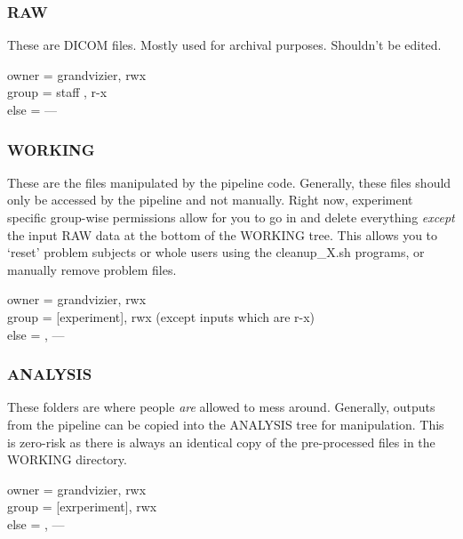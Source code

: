 \documentclass[final,titlepage,letterpaper,oneside,12pt]{article}
\renewcommand{\texttt}[2][BrickRed]{\textcolor{#1}{\ttfamily #2}}%
\begin{document}
\subsubsection{RAW}

These are DICOM files. Mostly used for archival purposes. Shouldn't be edited.

\begin{flushleft}
\texttt{owner = grandvizier, rwx \\
        group = staff      , r-x \\
        else  = ---} \\
\end{flushleft}

\subsubsection{WORKING}

These are the files manipulated by the pipeline code. Generally, these files should only be accessed by the pipeline and not manually. Right now, experiment specific group-wise permissions allow for you to go in and delete everything \textit{except} the input RAW data at the bottom of the WORKING tree. This allows you to `reset' problem subjects or whole users using the {\color{red}\texttt{cleanup\_X.sh}} programs, or manually remove problem files.

\begin{flushleft}

\texttt{owner = grandvizier, rwx \\
        group = [experiment], rwx (except inputs which are r-x) \\
        else  =            , ---} \\
\end{flushleft}

\subsubsection{ANALYSIS}

These folders are where people \textit{are} allowed to mess around. Generally, outputs from the pipeline can be copied into the ANALYSIS tree for manipulation. This is zero-risk as there is always an identical copy of the pre-processed files in the WORKING directory.

\begin{flushleft}
\texttt{owner = grandvizier, rwx \\
        group = [exrperiment], rwx \\
        else  =            , ---} \\
\end{flushleft}
\end{document}
